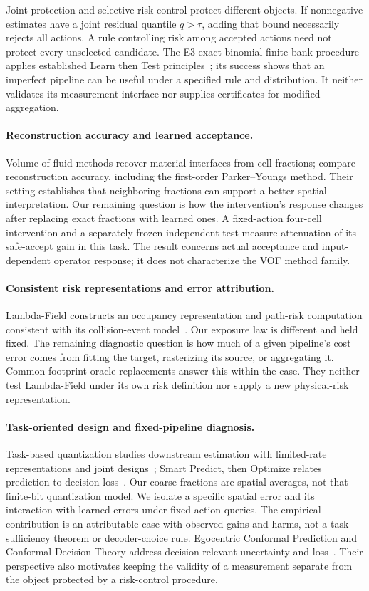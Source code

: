 Joint protection and selective-risk control protect different objects. If
nonnegative estimates have a joint residual quantile $ q>\tau $, adding that bound
necessarily rejects all actions. A rule controlling risk among accepted actions
need not protect every unselected candidate. The E3 exact-binomial finite-bank
procedure applies established Learn then Test principles~\citep{ltt}; its
success shows that an imperfect pipeline can be useful under a specified rule
and distribution. It neither validates its measurement interface nor supplies
certificates for modified aggregation.

\paragraph{Reconstruction accuracy and learned acceptance.}
Volume-of-fluid methods recover material interfaces from cell fractions;
\citet{pilliod2004} compare reconstruction accuracy, including the first-order
Parker--Youngs method. Their setting establishes that neighboring fractions
can support a better spatial interpretation. Our remaining question is how the
intervention's response changes after replacing exact fractions with learned
ones. A fixed-action four-cell intervention and a separately frozen independent
test measure attenuation of its safe-accept gain in this task. The result
concerns actual acceptance and input-dependent operator response; it does not
characterize the VOF method family.

\paragraph{Consistent risk representations and error attribution.}
Lambda-Field constructs an occupancy representation and path-risk computation
consistent with its collision-event model~\citep{lambda2019}. Our exposure law
is different and held fixed. The remaining diagnostic question is how much of
a given pipeline's cost error comes from fitting the target, rasterizing its
source, or aggregating it. Common-footprint oracle replacements answer this
within the case. They neither test Lambda-Field under its own risk definition
nor supply a new physical-risk representation.

\paragraph{Task-oriented design and fixed-pipeline diagnosis.}
Task-based quantization studies downstream estimation with limited-rate
representations and joint designs~\citep{shlezinger2019}; Smart Predict, then
Optimize relates prediction to decision loss~\citep{spo}. Our coarse fractions
are spatial averages, not that finite-bit quantization model. We isolate a
specific spatial error and its interaction with learned errors under fixed
action queries. The empirical contribution is an attributable case with
observed gains and harms, not a task-sufficiency theorem or decoder-choice rule.
Egocentric Conformal Prediction and Conformal Decision Theory address
decision-relevant uncertainty and loss~\citep{egocentric,cdt}. Their perspective
also motivates keeping the validity of a measurement separate from the object
protected by a risk-control procedure.

